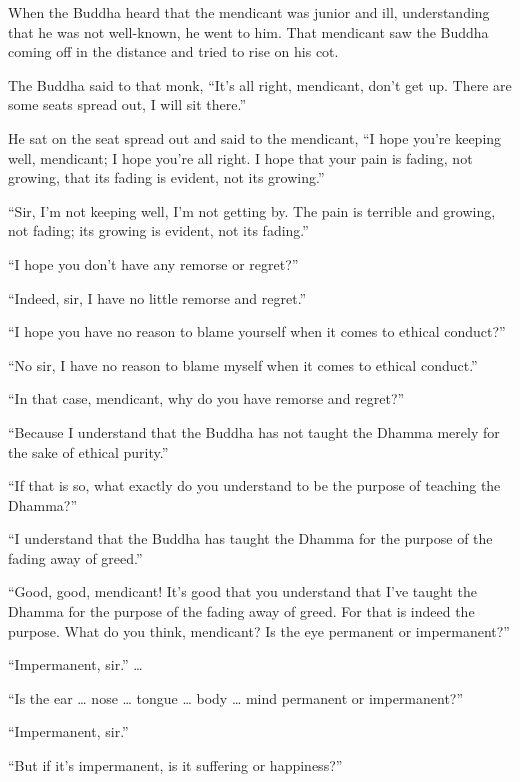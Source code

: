 \documentclass[12pt,openany]{book}%
\begin{document}
When the Buddha heard that the mendicant was junior and ill, understanding that he was not well-known, he went to him. That mendicant saw the Buddha coming off in the distance and tried to rise on his cot. 

The Buddha said to that monk, “It’s all right, mendicant, don’t get up. There are some seats spread out, I will sit there.” 

He sat on the seat spread out and said to the mendicant, “I hope you’re keeping well, mendicant; I hope you’re all right. I hope that your pain is fading, not growing, that its fading is evident, not its growing.” 

“Sir, I’m not keeping well, I’m not getting by. The pain is terrible and growing, not fading; its growing is evident, not its fading.” 

“I hope you don’t have any remorse or regret?” 

“Indeed, sir, I have no little remorse and regret.” 

“I hope you have no reason to blame yourself when it comes to ethical conduct?” 

“No sir, I have no reason to blame myself when it comes to ethical conduct.” 

“In that case, mendicant, why do you have remorse and regret?” 

“Because I understand that the Buddha has not taught the Dhamma merely for the sake of ethical purity.” 

“If that is so, what exactly do you understand to be the purpose of teaching the Dhamma?” 

“I understand that the Buddha has taught the Dhamma for the purpose of the fading away of greed.” 

“Good, good, mendicant! It’s good that you understand that I’ve taught the Dhamma for the purpose of the fading away of greed. For that is indeed the purpose. What do you think, mendicant? Is the eye permanent or impermanent?” 

“Impermanent, sir.” … 

“Is the ear … nose … tongue … body … mind permanent or impermanent?” 

“Impermanent, sir.” 

“But if it’s impermanent, is it suffering or happiness?” 
\end{document}
